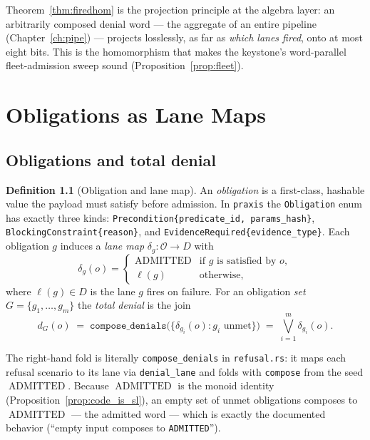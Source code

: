 \documentclass[11pt,oneside]{book}
\theoremstyle{definition}
\newtheorem{definition}{Definition}[chapter]
\theoremstyle{plain}
\theoremstyle{remark}
\newcommand{\Obs}{\mathcal{O}}                 %
\newcommand{\code}[1]{\texttt{#1}}
\newcommand{\Deny}{D}                 %
\newcommand{\Adml}{\operatorname{ADMITTED}}          %
\begin{document}
Theorem~\ref{thm:firedhom} is the projection principle at the algebra layer: an arbitrarily composed denial word --- the aggregate of an entire pipeline (Chapter~\ref{ch:pipe}) --- projects losslessly, as far as \emph{which lanes fired}, onto at most eight bits. %
This is the homomorphism that makes the keystone's word-parallel fleet-admission sweep sound (Proposition~\ref{prop:fleet}). %

\chapter{Obligations as Lane Maps}
\label{ch:ob}

\section{Obligations and total denial}

\begin{definition}[Obligation and lane map]\label{def:ob}
An \emph{obligation} is a first-class, hashable value the payload must satisfy before admission. %
In \code{praxis} the \code{Obligation} enum has exactly three kinds: \code{Precondition\{predicate\_id, params\_hash\}}, \code{BlockingConstraint\{reason\}}, and \code{EvidenceRequired\{evidence\_type\}}. %
Each obligation $g$ induces a \emph{lane map} $\delta_g:\Obs\to\Deny$ with
\[
\delta_g(o)=\begin{cases}\Adml & \text{if }g\text{ is satisfied by }o,\\[2pt]
\ell(g) & \text{otherwise,}\end{cases}
\]
where $\ell(g)\in\Deny$ is the lane $g$ fires on failure. %
For an obligation \emph{set} $G=\{g_1,\dots,g_m\}$ the \emph{total denial} is the join %
\[
d_G(o)\;=\;\code{compose\_denials}\bigl(\{\delta_{g_i}(o):g_i\text{ unmet}\}\bigr)
\;=\;\bigvee_{i=1}^{m}\delta_{g_i}(o).
\] %
\end{definition}

The right-hand fold is literally \code{compose\_denials} in \code{refusal.rs}: it maps each refusal scenario to its lane via \code{denial\_lane} and folds with \code{compose} from the seed $\Adml$. %
Because $\Adml$ is the monoid identity (Proposition~\ref{prop:code_is_sl}), an empty set of unmet obligations composes to $\Adml$ --- the admitted word --- which is exactly the documented behavior (``empty input composes to \code{ADMITTED}''). %
\end{document}

